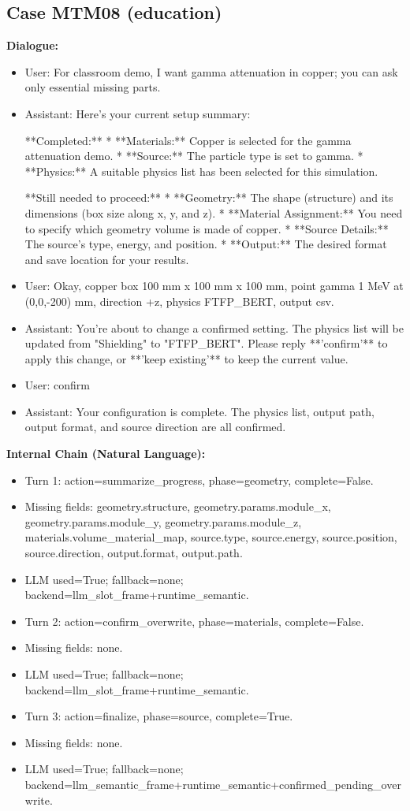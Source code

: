\documentclass[11pt]{ctexart}
\begin{document}
\subsection{Case MTM08 (education)}
\textbf{Dialogue:}
\begin{itemize}
\item User: For classroom demo, I want gamma attenuation in copper; you can ask only essential missing parts.
\item Assistant: Here's your current setup summary:

**Completed:**
*   **Materials:** Copper is selected for the gamma attenuation demo.
*   **Source:** The particle type is set to gamma.
*   **Physics:** A suitable physics list has been selected for this simulation.

**Still needed to proceed:**
*   **Geometry:** The shape (structure) and its dimensions (box size along x, y, and z).
*   **Material Assignment:** You need to specify which geometry volume is made of copper.
*   **Source Details:** The source's type, energy, and position.
*   **Output:** The desired format and save location for your results.
\item User: Okay, copper box 100 mm x 100 mm x 100 mm, point gamma 1 MeV at (0,0,-200) mm, direction +z, physics FTFP\_BERT, output csv.
\item Assistant: You're about to change a confirmed setting. The physics list will be updated from "Shielding" to "FTFP\_BERT". Please reply **'confirm'** to apply this change, or **'keep existing'** to keep the current value.
\item User: confirm
\item Assistant: Your configuration is complete. The physics list, output path, output format, and source direction are all confirmed.
\end{itemize}
\textbf{Internal Chain (Natural Language):}
\begin{itemize}
\item Turn 1: action=summarize\_progress, phase=geometry, complete=False.
\item Missing fields: geometry.structure, geometry.params.module\_x, geometry.params.module\_y, geometry.params.module\_z, materials.volume\_material\_map, source.type, source.energy, source.position, source.direction, output.format, output.path.
\item LLM used=True; fallback=none; backend=llm\_slot\_frame+runtime\_semantic.
\item Turn 2: action=confirm\_overwrite, phase=materials, complete=False.
\item Missing fields: none.
\item LLM used=True; fallback=none; backend=llm\_slot\_frame+runtime\_semantic.
\item Turn 3: action=finalize, phase=source, complete=True.
\item Missing fields: none.
\item LLM used=True; fallback=none; backend=llm\_semantic\_frame+runtime\_semantic+confirmed\_pending\_overwrite.
\end{itemize}
\end{document}
